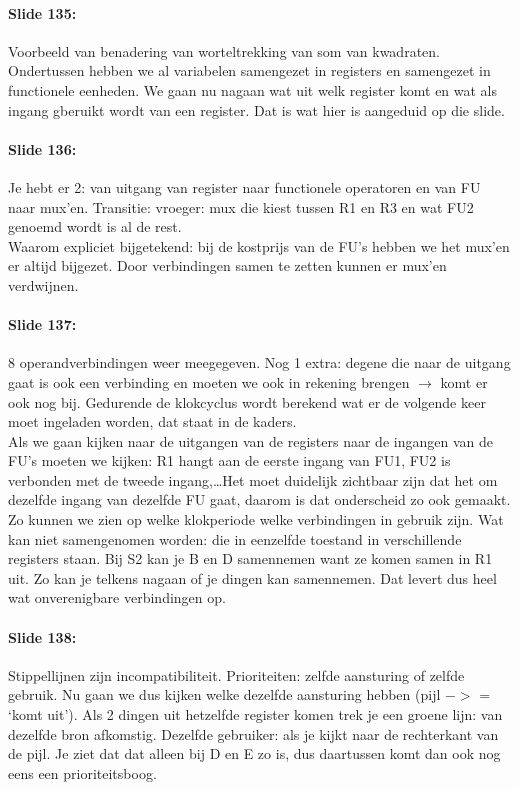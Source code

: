 \documentclass[10pt,a4paper]{book}
\begin{document}
\paragraph{Slide 135:} Voorbeeld van benadering van worteltrekking van som van kwadraten. Ondertussen hebben we al variabelen samengezet in registers en samengezet in functionele eenheden. We gaan nu nagaan wat uit welk register komt en wat als ingang gberuikt wordt van een register. Dat is wat hier is aangeduid op die slide.

\paragraph{Slide 136:} Je hebt er 2: van uitgang van register naar functionele operatoren en van FU naar mux'en. Transitie: vroeger: mux die kiest tussen R1 en R3 en wat FU2 genoemd wordt is al de rest.\\
Waarom expliciet bijgetekend: bij de kostprijs van de FU's hebben we het mux'en er altijd bijgezet. Door verbindingen samen te zetten kunnen er mux'en verdwijnen.

\paragraph{Slide 137:} 8 operandverbindingen weer meegegeven. Nog 1 extra: degene die naar de uitgang gaat is ook een verbinding en moeten we ook in rekening brengen $\rightarrow$ komt er ook nog bij. Gedurende de klokcyclus wordt berekend wat er de volgende keer moet ingeladen worden, dat staat in de kaders.\\
Als we gaan kijken naar de uitgangen van de registers naar de ingangen van de FU's moeten we kijken: R1 hangt aan de eerste ingang van FU1, FU2 is verbonden met de tweede ingang,\ldots Het moet duidelijk zichtbaar zijn dat het om dezelfde ingang van dezelfde FU gaat, daarom is dat onderscheid zo ook gemaakt.\\
Zo kunnen we zien op welke klokperiode welke verbindingen in gebruik zijn. Wat kan niet samengenomen worden: die in eenzelfde toestand in verschillende registers staan. Bij S2 kan je B en D samennemen want ze komen samen in R1 uit. Zo kan je telkens nagaan of je dingen kan samennemen. Dat levert dus heel wat onverenigbare verbindingen op.

\paragraph{Slide 138:} Stippellijnen zijn incompatibiliteit. Prioriteiten: zelfde aansturing of zelfde gebruik. Nu gaan we dus kijken welke dezelfde aansturing hebben (pijl $->$ = `komt uit'). Als 2 dingen uit hetzelfde register komen trek je een groene lijn: van dezelfde bron afkomstig. Dezelfde gebruiker: als je kijkt naar de rechterkant van de pijl. Je ziet dat dat alleen bij D en E zo is, dus daartussen komt dan ook nog eens een prioriteitsboog.
\end{document}

